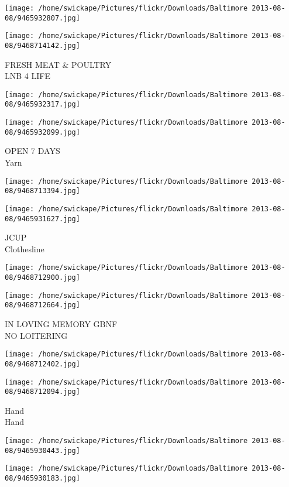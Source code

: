 \documentclass[10pt,letterpaper]{article}
\begin{document}
\texttt{[image: /home/swickape/Pictures/flickr/Downloads/Baltimore 2013-08-08/9465932807.jpg]}

\vspace{0.25in}
\texttt{[image: /home/swickape/Pictures/flickr/Downloads/Baltimore 2013-08-08/9468714142.jpg]}

FRESH MEAT \& POULTRY\\
LNB 4 LIFE
\pagebreak

\texttt{[image: /home/swickape/Pictures/flickr/Downloads/Baltimore 2013-08-08/9465932317.jpg]}

\vspace{0.25in}
\texttt{[image: /home/swickape/Pictures/flickr/Downloads/Baltimore 2013-08-08/9465932099.jpg]}

OPEN 7 DAYS\\
Yarn
\pagebreak

\texttt{[image: /home/swickape/Pictures/flickr/Downloads/Baltimore 2013-08-08/9468713394.jpg]}

\vspace{0.25in}
\texttt{[image: /home/swickape/Pictures/flickr/Downloads/Baltimore 2013-08-08/9465931627.jpg]}

JCUP\\
Clothesline
\pagebreak

\texttt{[image: /home/swickape/Pictures/flickr/Downloads/Baltimore 2013-08-08/9468712900.jpg]}

\vspace{0.25in}
\texttt{[image: /home/swickape/Pictures/flickr/Downloads/Baltimore 2013-08-08/9468712664.jpg]}

IN LOVING MEMORY GBNF\\
NO LOITERING
\pagebreak

\texttt{[image: /home/swickape/Pictures/flickr/Downloads/Baltimore 2013-08-08/9468712402.jpg]}

\vspace{0.25in}
\texttt{[image: /home/swickape/Pictures/flickr/Downloads/Baltimore 2013-08-08/9468712094.jpg]}

Hand\\
Hand
\pagebreak

\texttt{[image: /home/swickape/Pictures/flickr/Downloads/Baltimore 2013-08-08/9465930443.jpg]}

\vspace{0.25in}
\texttt{[image: /home/swickape/Pictures/flickr/Downloads/Baltimore 2013-08-08/9465930183.jpg]}
\end{document}
